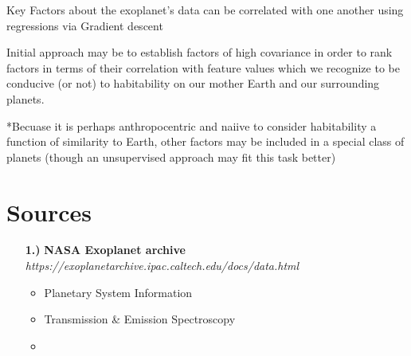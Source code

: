 \documentclass[12pt]{article}
\begin{document}
Key Factors about the exoplanet's data can be correlated with one another using regressions via Gradient descent

Initial approach may be to establish factors of high covariance in order to rank factors in terms of their correlation with feature values which we recognize to be conducive (or not) to habitability on our mother Earth and our surrounding planets.

*Becuase it is perhaps anthropocentric and naiive to consider habitability a function of similarity to Earth, other factors may be included in a special class of planets (though an unsupervised approach may fit this task better)

\section{Sources}

\begin{itemize}
\item[{\bf 1.)}] \textbf{ NASA Exoplanet archive} \\
\emph{https://exoplanetarchive.ipac.caltech.edu/docs/data.html}
\begin{itemize}
\item Planetary System Information
\item Transmission \& Emission Spectroscopy
\item 
\end{itemize}
\end{itemize}
\end{document}
